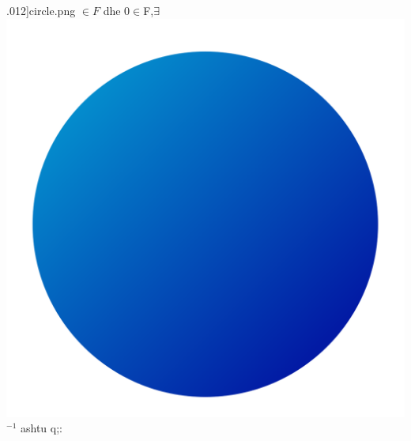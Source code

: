 \documentclass[12pt]{article}
\begin{document}
\begin{enumerate}
.012]{circle.png} $\in F$ dhe $0 \in$F,$\exists$ \includegraphics[scale=.012]{circle.png}$^{-1}$ ashtu q;:\\

\end{enumerate}
\end{document}
